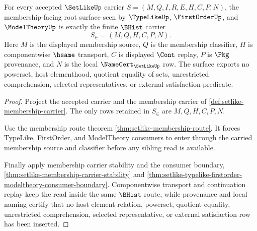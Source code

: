 \begin{theorem}
\label{thm:setlike-membership-carrier}
For every accepted $\SetLikeUp$ carrier $S=(M,Q,I,R,E,H,C,P,N)$, the membership-facing root surface seen by $\TypeLikeUp$, $\FirstOrderUp$, and $\ModelTheoryUp$ is exactly the finite $\BHist$ carrier
$$
S_{\in}=(M,Q,H,C,P,N).
$$
Here $M$ is the displayed membership source, $Q$ is the membership classifier, $H$ is componentwise $\hsame$ transport, $C$ is displayed $\Cont$ replay, $P$ is $\Pkg$ provenance, and $N$ is the local $\NameCert_{\SetLikeUp}$ row. The surface exports no powerset, host elementhood, quotient equality of sets, unrestricted comprehension, selected representatives, or external satisfaction predicate.
\end{theorem}
\begin{proof}
Project the accepted carrier and the membership carrier of \autoref{def:setlike-membership-carrier}. The only rows retained in $S_{\in}$ are $M,Q,H,C,P,N$.

Use the membership route theorem \autoref{thm:setlike-membership-route}. It forces TypeLike, FirstOrder, and ModelTheory consumers to enter through the carried membership source and classifier before any sibling read is available.

Finally apply membership carrier stability and the consumer boundary, \autoref{thm:setlike-membership-carrier-stability} and \autoref{thm:setlike-typelike-firstorder-modeltheory-consumer-boundary}. Componentwise transport and continuation replay keep the read inside the same $\BHist$ route, while provenance and local naming certify that no host element relation, powerset, quotient equality, unrestricted comprehension, selected representative, or external satisfaction row has been inserted.
\end{proof}

